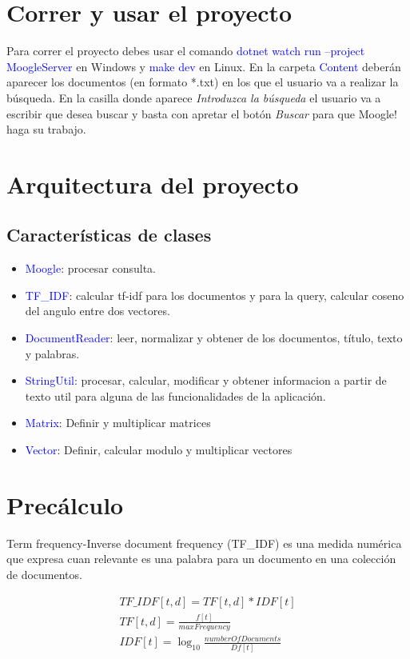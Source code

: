 \documentclass[12pt, a4paper]{article}
\renewcommand{\emph}{\textcolor{blue}}
\begin{document}
\section*{Correr y usar el proyecto}

Para correr el proyecto debes usar el comando \emph{dotnet watch run --project MoogleServer} en Windows
y \emph{make dev} en Linux. En la carpeta \emph{Content} deberán aparecer los documentos (en formato *.txt) en los que el
usuario va a realizar la búsqueda. En la casilla donde aparece \textit{Introduzca la búsqueda} el usuario va a escribir
que desea buscar y basta con apretar el botón \textit{Buscar} para que Moogle! haga su trabajo.


\section*{Arquitectura del proyecto}

\subsection*{Características de clases}

\begin{itemize}
    \item \emph{Moogle}: procesar consulta.
    \item \emph{TF\_IDF}: calcular tf-idf para los documentos y para la query, calcular coseno del angulo entre dos vectores.
    \item \emph{DocumentReader}: leer, normalizar y obtener de los documentos, título, texto y palabras.
    \item \emph{StringUtil}: procesar, calcular, modificar y obtener informacion a partir de texto util para alguna de las funcionalidades de la aplicación.
    \item \emph{Matrix}: Definir y multiplicar matrices
    \item \emph{Vector}: Definir, calcular modulo y multiplicar vectores
\end{itemize}

\section*{Precálculo}

Term frequency-Inverse document frequency (TF\_IDF) es una medida numérica que expresa cuan
relevante es una palabra para un documento en una colección de documentos.

\begin{eqnarray*}
    TF\_IDF[t,d] = TF[t,d] * IDF[t] \\
    TF[t,d] = \frac{f[t]}{maxFrequency} \\
    IDF[t] = \log_{10}{\frac{numberOfDocuments}{Df[t]}}
\end{eqnarray*}
\end{document}
